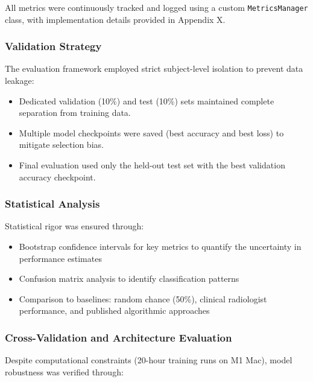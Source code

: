 \documentclass[12pt, a4paper]{article}
\begin{document}
All metrics were continuously tracked and logged using a custom \texttt{MetricsManager} class, with implementation details provided in Appendix X.

\subsubsection{Validation Strategy}

The evaluation framework employed strict subject-level isolation to prevent data leakage:

\begin{itemize}
    \item Dedicated validation (10\%) and test (10\%) sets maintained complete separation from training data.
    
    \item Multiple model checkpoints were saved (best accuracy and best loss) to mitigate selection bias.
    
    \item Final evaluation used only the held-out test set with the best validation accuracy checkpoint.
\end{itemize}

\subsubsection{Statistical Analysis}

Statistical rigor was ensured through:

\begin{itemize}
    \item Bootstrap confidence intervals for key metrics to quantify the uncertainty in performance estimates
    
    \item Confusion matrix analysis to identify classification patterns
    
    \item Comparison to baselines: random chance (50\%), clinical radiologist performance, and published algorithmic approaches
\end{itemize}

\subsubsection{Cross-Validation and Architecture Evaluation}

Despite computational constraints (20-hour training runs on M1 Mac), model robustness was verified through:
\end{document}
